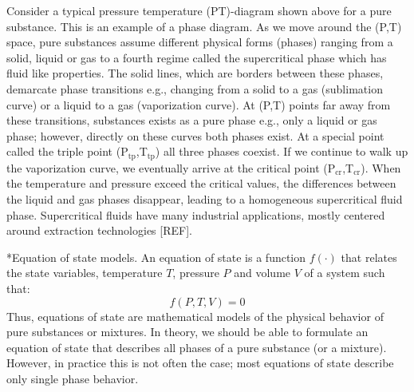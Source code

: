 \documentclass[11pt]{article}
\makeatletter
\theoremstyle{definition}
\renewcommand\subsection{\@startsection
	{subsection}{2}{0mm}
	{-0.05in}
	{0.5\baselineskip}
	{\normalfont\normalsize\bfseries}}
\makeatother
\begin{document}
Consider a typical pressure temperature (PT)-diagram shown above for a pure substance.
This is an example of a phase diagram.
As we move around the (P,T) space, pure substances assume different physical forms (phases) ranging from a solid, liquid or gas to a fourth regime
called the supercritical phase which has fluid like properties.
The solid lines, which are borders between these phases, demarcate phase transitions e.g., changing from a solid to a gas (sublimation curve)
or a liquid to a gas (vaporization curve).
At (P,T) points far away from these transitions, substances exists as a pure phase e.g., only a liquid or gas phase;
however, directly on these curves both phases exist.
At a special point called the triple point (P$_{\mathrm{tp}}$,T$_{\mathrm{tp}}$)
all three phases coexist. If we continue to walk up the vaporization curve, we eventually arrive at the critical point (P$_{\mathrm{cr}}$,T$_{\mathrm{cr}}$).
When the temperature and pressure exceed the critical values, the differences between the liquid and gas phases disappear,
leading to a homogeneous supercritical fluid phase.
Supercritical fluids have many industrial applications, mostly centered around extraction technologies [REF].


\subsection*{Equation of state models.}
An equation of state is a function $f(\cdot)$ that relates the state variables, temperature $T$, pressure $P$ and volume $V$ of a system such that:
\begin{equation}
f\left(P,T,V\right) = 0
\end{equation}
Thus, equations of state are mathematical models of the physical behavior of pure substances or mixtures.
In theory, we should be able to formulate an equation of state that describes all phases of a pure substance (or a mixture).
However, in practice this is not often the case; most equations of state describe only single phase behavior.
\end{document}
